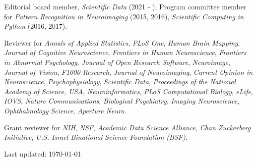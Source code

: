\documentclass[11pt,fullpage]{article}
\begin{document}
Editorial board member, \emph{Scientific Data} (2021 - ); Program committee member for \emph{Pattern Recognition in Neuroimaging} (2015, 2016), \emph{Scientific Computing in Python} (2016, 2017).

\vspace{4pt}

Reviewer for \emph{Annals of Applied Statistics}, \emph{PLoS One}, \emph{Human Brain Mapping}, \emph{Journal of Cognitive Neuroscience}, \emph{Frontiers in Human Neuroscience}, \emph{Frontiers in Abnormal Psychology}, \emph{Journal of Open Research Software}, \emph{Neuroimage}, \emph{Journal of Vision}, \emph{F1000 Research}, \emph{Journal of Neuroimaging}, \emph{Current Opinion in Neuroscience}, \emph{Psychophysiology}, \emph{Scientific Data}, \emph{Proceedings of the National Academy of Science, USA}, \emph{Neuroinformatics}, \emph{PLoS Computational Biology}, \emph{eLife}, \emph{IOVS}, \emph{Nature Communications}, \emph{Biological Psychiatry}, \emph{Imaging Neuroscience}, \emph{Ophthalmology Science}, \emph{Aperture Neuro}.

\vspace{4pt}

Grant reviewer for \emph{NIH}, \emph{NSF}, \emph{Academic Data Science Alliance}, \emph{Chan Zuckerberg Initiative}, \emph{U.S.-Israel Binational Science Foundation (BSF)}.


\bigskip
\begin{center}
  \begin{footnotesize}
    Last updated: \today
  \end{footnotesize}
\end{center}

\end{document}
